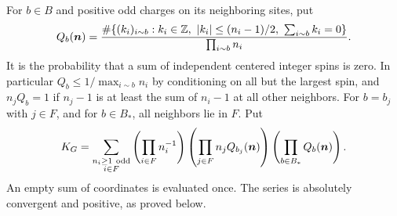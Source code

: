 For \(b\in B\) and positive odd charges on its neighboring sites, put
\[
 Q_b(\boldsymbol n)=
 \frac{\#\{(k_i)_{i\sim b}:
           k_i\in\mathbb Z,\ |k_i|\le(n_i-1)/2,\ \sum_{i\sim b} k_i=0\}}
      {\prod_{i\sim b} n_i}.
\]
It is the probability that a sum of independent centered integer spins is zero. In particular \(Q_b\le1/\max_{i\sim b}n_i\) by conditioning on all but the largest spin, and \(n_jQ_b=1\) if \(n_j-1\) is at least the sum of \(n_i-1\) at all other neighbors. For \(b=b_j\) with \(j\in F\), and for \(b\in B_*\), all neighbors lie in \(F\). Put
\[
 K_G=\sum_{\substack{n_i\ge1\ {\rm odd}\\ i\in F}}
        \left(\prod_{i\in F} n_i^{-1}\right)
        \left(\prod_{j\in F} n_j Q_{b_j}(\boldsymbol n)\right)
        \left(\prod_{b\in B_*} Q_b(\boldsymbol n)\right).
\]
An empty sum of coordinates is evaluated once. The series is absolutely convergent and positive, as proved below.

